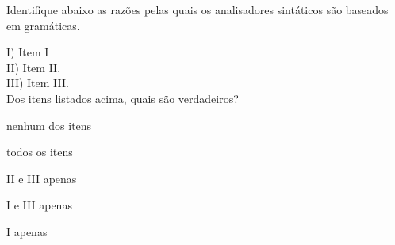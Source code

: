 \question[10]

Identifique abaixo as razões pelas quais os analisadores sintáticos são
baseados em gramáticas.

I) Item I\\
II) Item II.\\
III) Item III.\\

Dos itens listados acima, quais são verdadeiros?\\

\begin{choices}
    \item nenhum dos itens
    \item todos os itens %
    \item II e III apenas
    \item I e III apenas
    \item I apenas
\end{choices}
\answerline

